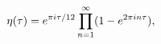 \[\mathop{\eta\/}\nolimits\!\left(\tau\right)=e^{\pi i\tau/12}\prod_{n=1}^{%
\infty}(1-e^{2\pi in\tau}),\]